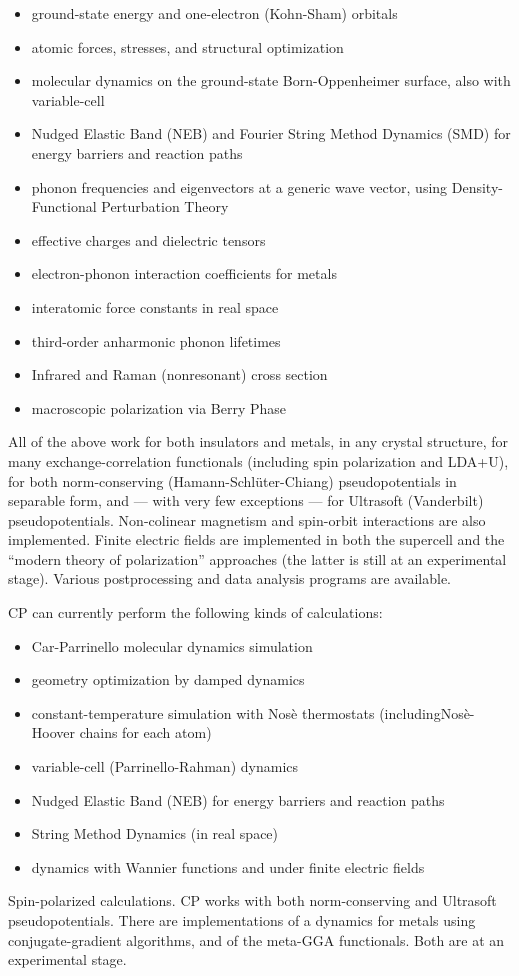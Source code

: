 \documentclass[12pt,a4paper]{article}
\begin{document}
\begin{itemize}
  \item ground-state energy and one-electron (Kohn-Sham) orbitals
  \item atomic forces, stresses, and structural optimization
  \item molecular dynamics on the ground-state Born-Oppenheimer
        surface, also with variable-cell
  \item Nudged Elastic Band (NEB) and Fourier String Method Dynamics (SMD)
        for energy barriers and reaction paths
  \item phonon frequencies and eigenvectors at a generic wave vector,
        using Density-Functional Perturbation Theory
  \item effective charges and dielectric tensors
  \item electron-phonon interaction coefficients for metals
  \item interatomic force constants in real space
  \item third-order anharmonic phonon lifetimes
  \item Infrared and Raman (nonresonant) cross section
  \item macroscopic polarization via Berry Phase
\end{itemize}
All of the above work for both insulators and metals, in any crystal
structure, for many exchange-correlation functionals (including spin
polarization and LDA+U), for both norm-conserving (Hamann-Schl\"uter-Chiang)
pseudopotentials in separable form, and --- with very few exceptions
--- for Ultrasoft (Vanderbilt) pseudopotentials.  Non-colinear
magnetism and spin-orbit interactions are also implemented.  Finite
electric fields are implemented in both the supercell and the 
``modern theory of polarization'' approaches (the latter is still 
at an experimental stage).
Various postprocessing and data analysis programs are available.

CP can currently perform the following kinds of calculations:

\begin{itemize}
  \item Car-Parrinello molecular dynamics simulation
  \item geometry optimization by damped dynamics
  \item constant-temperature simulation with Nos\`e thermostats
        (including\break Nos\`e-Hoover chains for each atom)
  \item variable-cell (Parrinello-Rahman) dynamics
  \item Nudged Elastic Band (NEB) for energy barriers and reaction
        paths
  \item String Method Dynamics (in real space)
  \item dynamics with Wannier functions and under finite electric
        fields 
\end{itemize}
Spin-polarized calculations.
CP works with both norm-conserving and Ultrasoft pseudopotentials.
There are implementations of a dynamics for metals using 
conjugate-gradient algorithms, and of the meta-GGA functionals.
Both are at an experimental stage.
\end{document}
